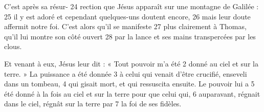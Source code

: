 C'est après sa résur-	 
24	 	rection que Jésus apparaît sur une montagne de Galilée :	 
25	 	il y est adoré et cependant quelques-uns doutent encore,	 
26	 	mais leur doute affermit notre foi. C'est alors qu'il se manifeste	 
27	 	plus clairement à Thomas, qu'il lui montre son côté ouvert	 
28	 	par la lance et ses mains transpercées par les clous.

Et venant à eux, Jésus leur dit : « Tout pouvoir m'a été	 
2	 	donné au ciel et sur la terre. » La puissance a été donnée	 
3	 	à celui qui venait d'être crucifié, enseveli dans un tombeau,	 
4	 	qui gisait mort, et qui ressuscita ensuite. Le pouvoir lui a	 
5	 	été donné à la fois au ciel et sur la terre pour que celui qui,	 
6	 	auparavant, régnait dans le ciel, régnât sur la terre par	 
7	 	la foi de ses fidèles.

